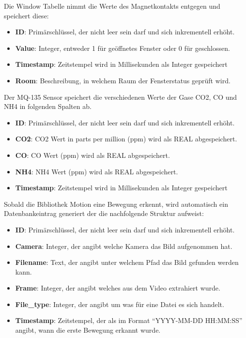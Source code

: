 Die Window Tabelle nimmt die Werte des Magnetkontakts entgegen und speichert diese:
\begin{itemize}
	\item \textbf{ID}: Primärschlüssel, der nicht leer sein darf und sich inkrementell erhöht.  
	\item \textbf{Value}: Integer, entweder 1 für geöffnetes Fenster oder 0 für geschlossen.
	\item \textbf{Timestamp}: Zeitstempel wird in Millisekunden als Integer gespeichert
	\item \textbf{Room}: Beschreibung, in welchem Raum der Fensterstatus geprüft wird. 
\end{itemize}

Der MQ-135 Sensor speichert die verschiedenen Werte der Gase CO2, CO und NH4 in folgenden Spalten ab.
\begin{itemize}
	\item \textbf{ID}: Primärschlüssel, der nicht leer sein darf und sich inkrementell erhöht.  
	\item \textbf{CO2}: CO2 Wert in parts per million (ppm) wird als REAL abgespeichert.
	\item \textbf{CO}: CO Wert (ppm) wird als REAL abgespeichert.
	\item \textbf{NH4}: NH4 Wert (ppm) wird als REAL abgespeichert. 
	\item \textbf{Timestamp}: Zeitstempel wird in Millisekunden als Integer gespeichert
\end{itemize}

Sobald die Bibliothek Motion eine Bewegung erkennt, wird automatisch ein Datenbankeintrag generiert der die nachfolgende Struktur aufweist:
\begin{itemize}
	\item \textbf{ID}: Primärschlüssel, der nicht leer sein darf und sich inkrementell erhöht.  
	\item \textbf{Camera}: Integer, der angibt welche Kamera das Bild aufgenommen hat.
	\item \textbf{Filename}: Text, der angibt unter welchem Pfad das Bild gefunden werden kann.
	\item \textbf{Frame}: Integer, der angibt welches aus dem Video extrahiert wurde. 
	\item \textbf{File\_type}: Integer, der angibt um was für eine Datei es sich handelt.
	\item \textbf{Timestamp}: Zeitstempel, der als im Format \enquote{YYYY-MM-DD HH:MM:SS} angibt, wann die erste Bewegung erkannt wurde.	
\end{itemize}


